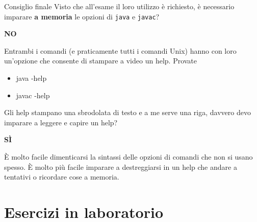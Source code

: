 \documentclass[presentation]{beamer}
\begin{document}
\begin{frame}{Consiglio finale}
  Visto che all'esame il loro utilizzo è richiesto, è necessario imparare \textbf{a memoria} le opzioni di \texttt{java} e \texttt{javac}?
  \begin{center}
    \textbf{NO}
  \end{center}
  Entrambi i comandi (e praticamente tutti i comandi Unix) hanno con loro un'opzione che consente di stampare a video un help. Provate
  \begin{block}{}
    \begin{itemize}
      \item java -help
      \item javac -help
    \end{itemize}
  \end{block}
  
  \vspace{10pt}
  
  Gli help stampano una sbrodolata di testo e a me serve una riga, davvero devo imparare a leggere e capire un help?
  \begin{center}
    \textbf{SÌ}
  \end{center}
  È molto facile dimenticarsi la sintassi delle opzioni di comandi che non si usano spesso. È molto più facile imparare a destreggiarsi in un help che andare a tentativi o ricordare cose a memoria.
\end{frame}


\section{Esercizi in laboratorio}


\end{document}
